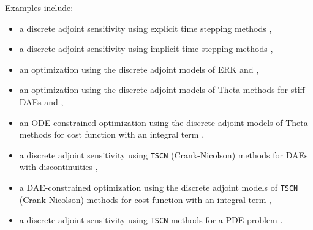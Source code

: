 Examples
include:
\begin{itemize}
\item a discrete adjoint sensitivity using explicit time stepping
  methods \href{http://www.mcs.anl.gov/petsc/petsc-current/src/ts/examples/tutorials/ex16adj.c.html}{},
\item a discrete adjoint sensitivity using implicit time stepping
  methods \href{http://www.mcs.anl.gov/petsc/petsc-current/src/ts/examples/tutorials/ex20adj.c.html}{},
\item an optimization using the discrete adjoint models of ERK
  \href{http://www.mcs.anl.gov/petsc/petsc-current/src/ts/examples/tutorials/ex16opt_ic.c.html}{} and \href{http://www.mcs.anl.gov/petsc/petsc-current/src/ts/examples/tutorials/ex16opt_p.c.html}{},
\item an optimization using the discrete adjoint models of Theta
methods for stiff DAEs
    \href{http://www.mcs.anl.gov/petsc/petsc-current/src/ts/examples/tutorials/ex20opt_ic.c.html}{} and \href{http://www.mcs.anl.gov/petsc/petsc-current/src/ts/examples/tutorials/ex20opt_p.c.html}{},
\item an ODE-constrained optimization using the discrete adjoint
  models of Theta methods for cost function with an integral term \href{http://www.mcs.anl.gov/petsc/petsc-current/src/ts/examples/tutorials/power_grid/ex3opt.c.html}{},
\item a discrete adjoint sensitivity using \lstinline{TSCN} (Crank-Nicolson)
  methods for DAEs with discontinuities \href{http://www.mcs.anl.gov/petsc/petsc-current/src/ts/examples/tutorials/power_grid/stability/stability_9bus/ex9busadj.c.html}{},
\item a DAE-constrained optimization using the discrete adjoint
models of \lstinline{TSCN} (Crank-Nicolson) methods for cost function with an
    integral term \href{http://www.mcs.anl.gov/petsc/petsc-current/src/ts/examples/tutorials/power_grid/stability/stability_9bus/ex9busopt.c.html}{},
  \item a discrete adjoint sensitivity using \lstinline{TSCN} methods for a
  PDE problem \href{http://www.mcs.anl.gov/petsc/petsc-current/src/ts/examples/tutorials/advection-diffusion-reaction/ex5adj.c.html}{}.
\end{itemize}

